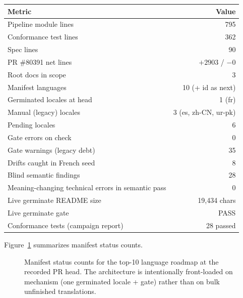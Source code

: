 \documentclass[11pt]{article}
\theoremstyle{definition}
\theoremstyle{plain}
\theoremstyle{remark}
\begin{document}
\begin{center}
\begin{tabular}{@{}lr@{}}
\toprule
Metric & Value \\
\midrule
Pipeline module lines & 795 \\
Conformance test lines & 362 \\
Spec lines & 90 \\
PR \#80391 net lines & $+2903$ / $-0$ \\
Root docs in scope & 3 \\
Manifest languages & 10 (+ id as next) \\
Germinated locales at head & 1 (fr) \\
Manual (legacy) locales & 3 (es, zh-CN, ur-pk) \\
Pending locales & 6 \\
Gate errors on check & 0 \\
Gate warnings (legacy debt) & 35 \\
Drifts caught in French seed & 8 \\
Blind semantic findings & 28 \\
Meaning-changing technical errors in semantic pass & 0 \\
Live germinate README size & 19{,}434 chars \\
Live germinate gate & PASS \\
Conformance tests (campaign report) & 28 passed \\
\bottomrule
\end{tabular}
\end{center}

Figure~\ref{fig:locale-status} summarizes manifest status counts.

\begin{figure}[H]
\centering
{}
\caption{Manifest status counts for the top-10 language roadmap at the
recorded PR head. The architecture is intentionally front-loaded on
mechanism (one germinated locale + gate) rather than on bulk unfinished
translations.}
\label{fig:locale-status}
\end{figure}
\end{document}
